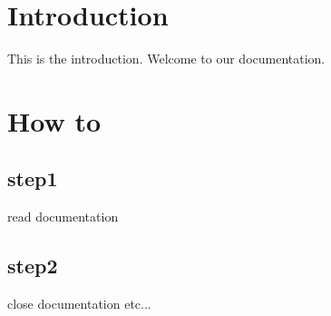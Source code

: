 \hypertarget{index_intro_sec}{}\section{Introduction}\label{index_intro_sec}
This is the introduction. Welcome to our documentation.\hypertarget{index_how_to}{}\section{How to}\label{index_how_to}
\hypertarget{index_step1}{}\subsection{step1}\label{index_step1}
read documentation \hypertarget{index_step2}{}\subsection{step2}\label{index_step2}
close documentation etc... 